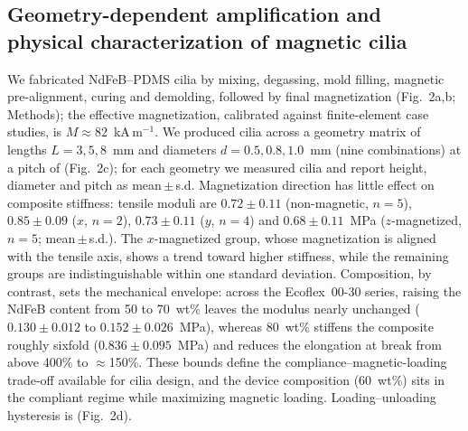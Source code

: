 \subsection*{Geometry-dependent amplification and physical characterization of magnetic cilia}
We fabricated NdFeB--PDMS cilia by mixing, degassing, mold filling,
magnetic pre-alignment, curing and demolding, followed by final
magnetization (Fig.~2a,b; Methods); the effective magnetization, calibrated
against finite-element case studies, is $M\approx82$~kA\,m$^{-1}$. We
produced cilia across a geometry matrix of lengths $L=3,5,8$~mm and
diameters $d=0.5,0.8,1.0$~mm (nine combinations) at a pitch of
 (Fig.~2c); for each geometry we measured
 cilia and report height, diameter and pitch as mean\,$\pm$\,s.d.
Magnetization direction has little effect on composite stiffness: tensile
moduli are $0.72\pm0.11$ (non-magnetic, $n=5$), $0.85\pm0.09$ ($x$, $n=2$),
$0.73\pm0.11$ ($y$, $n=4$) and $0.68\pm0.11$~MPa ($z$-magnetized, $n=5$;
mean\,$\pm$\,s.d.). The $x$-magnetized group, whose magnetization is aligned
with the tensile axis, shows a trend toward higher stiffness, while the
remaining groups are indistinguishable within one standard deviation.
Composition, by contrast, sets the mechanical envelope: across the
Ecoflex~00-30 series, raising the NdFeB content from 50 to 70~wt\% leaves
the modulus nearly unchanged ($0.130\pm0.012$ to $0.152\pm0.026$~MPa),
whereas 80~wt\% stiffens the composite roughly sixfold
($0.836\pm0.095$~MPa) and reduces the elongation at break from above 400\%
to $\approx$150\%. These bounds define the compliance--magnetic-loading
trade-off available for cilia design, and the device composition (60~wt\%)
sits in the compliant regime while maximizing magnetic loading.
Loading--unloading hysteresis is 
(Fig.~2d).

